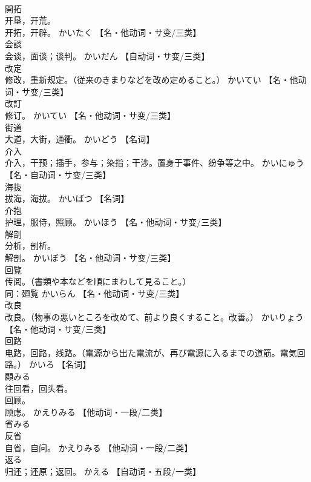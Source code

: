 \documentclass[8pt]{extreport}
\begin{document}
\begin{CJK}{UTF8}{min}
\\	開拓	
\\	开垦，开荒。 
\\	开拓，开辟。	かいたく		【名・他动词・サ变/三类】
\\	会談	
\\	会谈，面谈；谈判。	かいだん		【自动词・サ变/三类】
\\	改定	
\\	修改，重新规定。（従来のきまりなどを改め定めること。）	かいてい		【名・他动词・サ变/三类】
\\	改訂	
\\	修订。	かいてい		【名・他动词・サ变/三类】
\\	街道	
\\	大道，大街，通衢。	かいどう		【名词】
\\	介入	
\\	介入，干预；插手，参与；染指；干涉。置身于事件、纷争等之中。	かいにゅう		【名・自动词・サ变/三类】
\\	海抜	
\\	拔海，海拔。	かいばつ		【名词】
\\	介抱	
\\	护理，服侍，照顾。	かいほう		【名・他动词・サ变/三类】
\\	解剖	
\\	分析，剖析。 
\\	解剖。	かいぼう		【名・他动词・サ变/三类】
\\	回覧	
\\	传阅。（書類や本などを順にまわして見ること。） 
\\	同：廻覧	かいらん		【名・他动词・サ变/三类】
\\	改良	
\\	改良。（物事の悪いところを改めて、前より良くすること。改善。）	かいりょう		【名・他动词・サ变/三类】
\\	回路	
\\	电路，回路，线路。（電源から出た電流が、再び電源に入るまでの道筋。電気回路。）	かいろ		【名词】
\\	顧みる	
\\	往回看，回头看。 
\\	回顾。 
\\	顾虑。	かえりみる		【他动词・一段/二类】
\\	省みる	
\\	反省 
\\	自省，自问。	かえりみる		【他动词・一段/二类】
\\	返る	
\\	归还；还原；返回。	かえる		【自动词・五段/一类】

\end{CJK}
\end{document}
